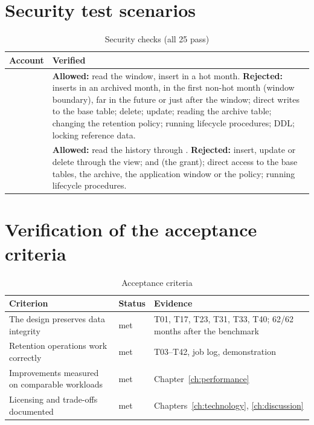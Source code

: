 \section{Security test scenarios}

\begin{table}[H]
\centering
\caption{Security checks (all 25 pass)}
\begin{tabularx}{\linewidth}{lL}
\toprule
Account & Verified \\
\midrule
{} & \textbf{Allowed:} read the window, insert in a hot month. \textbf{Rejected:} inserts in an archived month, in the first non-hot month (window boundary), far in the future or just after the window; direct writes to the base table; delete; update; reading the archive table; changing the retention policy; running lifecycle procedures; DDL; locking reference data. \\
 & \textbf{Allowed:} read the history through . \textbf{Rejected:} insert, update or delete through the view;  and  (the  grant); direct access to the base tables, the archive, the application window or the policy; running lifecycle procedures. \\
\bottomrule
\end{tabularx}
\end{table}

\section{Verification of the acceptance criteria}

\begin{table}[H]
\centering
\caption{Acceptance criteria}
\begin{tabularx}{\linewidth}{>{\raggedright\arraybackslash}p{5.2cm}lL}
\toprule
Criterion & Status & Evidence \\
\midrule
The design preserves data integrity & met & T01, T17, T23, T31, T33, T40; 62/62 months after the benchmark \\
Retention operations work correctly & met & T03--T42, job log, demonstration \\
Improvements measured on comparable workloads & met & Chapter~\ref{ch:performance} \\
Licensing and trade-offs documented & met & Chapters~\ref{ch:technology}, \ref{ch:discussion} \\
\bottomrule
\end{tabularx}
\end{table}
